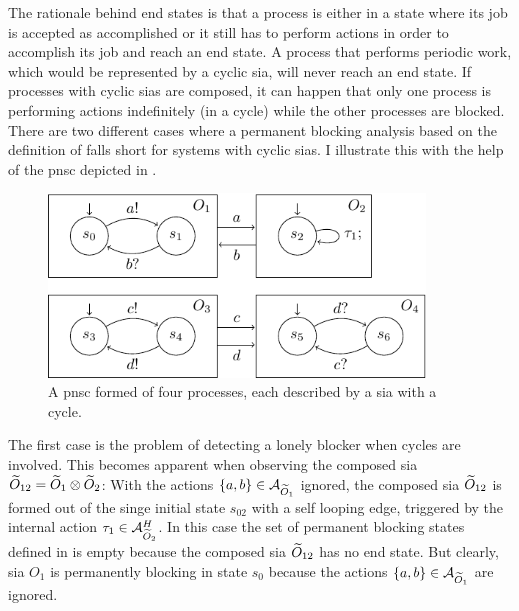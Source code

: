 
The rationale behind end states is that a process is either in a state where its job is accepted as accomplished or it still has to perform actions in order to accomplish its job and reach an end state.
A process that performs periodic work, which would be represented by a cyclic \gls{sia}, will never reach an end state.
If processes with cyclic \glspl{sia} are composed, it can happen that only one process is performing actions indefinitely (in a cycle) while the other processes are blocked.
There are two different cases where a permanent blocking analysis based on the definition of \Equ{\ref{eq_sia_block_end}} falls short for systems with cyclic \glspl{sia}.
I illustrate this with the help of the \gls{pnsc} depicted in \Fig{\ref{fig_pnsc_cycles}}.
\begin{figure}[bht]
    \TopFigSpace
    \centering
    \includegraphics[width=10cm]{fig/sia_pnsc_cycles.pdf}
    \CaptionFigSpace
    \caption{A \gls{pnsc} formed of four processes, each described by a \gls{sia} with a cycle.}
    \label{fig_pnsc_cycles}
    \BotFigSpace
\end{figure}

The first case is the problem of detecting a lonely blocker when cycles are involved.
This becomes apparent when observing the composed \gls{sia} $\widetilde{O}_{12} = \widetilde{O}_1 \otimes \widetilde{O}_2$:
With the actions $\{a, b\} \in \mathcal{A}_{\widetilde{O}_1}$ ignored, the composed \gls{sia} $\widetilde{O}_{12}$ is formed out of the singe initial state $s_{02}$ with a self looping edge, triggered by the internal action $\tau_1 \in \mathcal{A}_{\widetilde{O}_2}^H$.
In this case the set of permanent blocking states defined in \Equ{\ref{eq_sia_block_end}} is empty because the composed \gls{sia} $\widetilde{O}_{12}$ has no end state.
But clearly, \gls{sia} $O_1$ is permanently blocking in state $s_0$ because the actions $\{a, b\} \in \mathcal{A}_{\widetilde{O}_1}$ are ignored.

